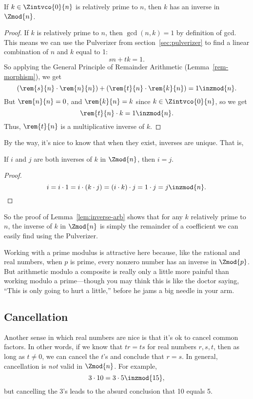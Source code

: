 \begin{lemma}\label{lem:inverse-arb} If $k \in \Zintvco{0}{n}$ is relatively prime to
$n$, then $k$ has an inverse in $\Zmod{n}$.
\end{lemma}

\begin{proof}
If $k$ is relatively prime to $n$, then $\gcd(n, k) = 1$ by definition
of gcd.  This means we can use the Pulverizer from
section~\ref{sec:pulverizer} to find a linear combination of $n$ and
$k$ equal to 1:
\[
s n + t k = 1.
\]
So applying the General Principle of Remainder Arithmetic
(Lemma~\ref{rem-morphism}), we get
\[
(\rem{s}{n} \cdot \rem{n}{n}) + (\rem{t}{n} \cdot \rem{k}{n}) = 1 \inzmod{n}.
\]
But $\rem{n}{n} = 0$, and $\rem{k}{n} = k$ since $k \in \Zintvco{0}{n}$, so we
  get
\[
\rem{t}{n} \cdot k = 1 \inzmod{n}.
\]
Thus, $\rem{t}{n}$ is a multiplicative inverse of $k$.
\end{proof}

By the way, it's nice to know that when they exist, inverses are
unique.  That is,
\begin{lemma}\label{uniq-inv}
If $i$ and $j$ are both inverses of $k$ in $\Zmod{n}$, then $i=j$.
\end{lemma}

\begin{proof}
\[
i = i \cdot 1 = i \cdot (k \cdot j) = (i \cdot k) \cdot j = 1 \cdot j = j \inzmod{n}.
\]
\end{proof}

So the proof of Lemma~\ref{lem:inverse-arb} shows that for any $k$
relatively prime to $n$, the inverse of $k$ in $\Zmod{n}$ is simply
the remainder of a coefficient we can easily find using the
Pulverizer.

Working with a prime modulus is attractive here because, like the
rational and real numbers, when $p$ is prime, every nonzero number has
an inverse in $\Zmod{p}$.  But arithmetic modulo a composite is really
only a little more painful than working modulo a prime---though you
may think this is like the doctor saying, ``This is only going to hurt
a little,'' before he jams a big needle in your arm.

\subsection{Cancellation}

Another sense in which real numbers are nice is that it's ok to cancel
common factors.  In other words, if we know that $t r = t s$ for real
numbers $r,s,t$, then as long as $t \neq 0$, we can cancel the $t$'s
and conclude that $r = s$.  In general, cancellation is \emph{not}
valid in $\Zmod{n}$.  For example,
\begin{equation}\label{3103515}
3 \cdot 10 = 3 \cdot 5 \inzmod{15},
\end{equation}
but cancelling the 3's leads to the absurd conclusion that 10 equals
5.

